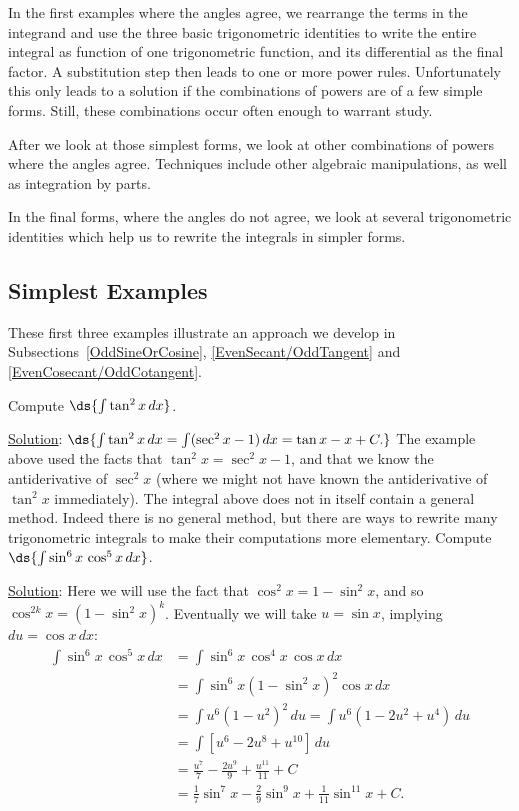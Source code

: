 In the first examples where the angles agree, 
we rearrange the terms in the integrand  and use 
the three basic trigonometric identities to write the
entire integral as function of one trigonometric function,
and its differential as the final factor.  A substitution
step then leads to one or more power rules.  Unfortunately
this  only leads to a solution  if the combinations of powers 
are of a few simple forms.  Still, these combinations occur
often enough to warrant study.

After we look at those simplest forms, we look at 
other combinations of powers where the angles agree.  
Techniques include other
algebraic manipulations, as well as integration by parts.

In the final forms, where the angles do not agree, we look
at several trigonometric identities which help us to 
rewrite the integrals in simpler forms.

\subsection{Simplest Examples}

These first three examples illustrate an approach we
develop in Subsections~\ref{OddSineOrCosine},
\ref{EvenSecant/OddTangent} and \ref{EvenCosecant/OddCotangent}.


\bex Compute $\ds{\int\tan^2x\,dx}$.

\underline{Solution}: 
$\ds{\int\tan^2x\,dx=\int(\sec^2x-1)\,dx=\tan x-x+C.}$
\eex
The example above used the facts that 
$\tan^2x=\sec^2x-1$, and that we know
the antiderivative of $\sec^2x$ (where we
might not have known the antiderivative of 
$\tan^2x$ immediately).  The integral above does
not in itself contain a general method.  Indeed there
is no general method, but there are ways to 
rewrite many trigonometric integrals to make their
computations more elementary.
\bex 
Compute  $\ds{\int\sin^6x\,\cos^5x\,dx}$.

\underline{Solution}: Here we will use the fact that 
$\cos^2x=1-\sin^2x$, and so $\cos^{2k}x=\left(1-\sin^2x\right)^k$.
Eventually  we will take $u=\sin x$, implying $du=\cos x\,dx$:
\begin{align*}
\int\sin^6x\,\cos^5x\,dx&=\int\sin^6x\,\cos^4x\,\cos x\,dx\\
                     &=\int\sin^6x\left(1-\sin^2x\right)^2\cos x\,dx\\
                  &=\int u^6\left(1-u^2\right)^2\,du
                     =\int u^6\left(1-2u^2+u^4\right)\,du\\
                  &=\int\left[u^6-2u^8+u^{10}\right]\,du\\
                  &=\frac{u^7}7-\frac{2u^9}9+\frac{u^{11}}{11}+C\\
                  &=\frac17\sin^7x-\frac29\sin^9x+\frac1{11}\sin^{11}x+C.
\end{align*}
\eex

